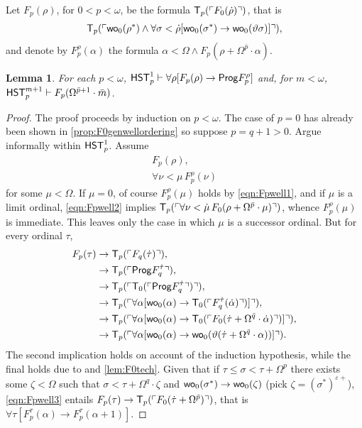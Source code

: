 \documentclass[UKenglish,cleveref,DIV=12]{scrartcl}
\newtheorem{lemma}{Lemma}[section]
\theoremstyle{definition}
\theoremstyle{definition}
\newcommand{\gelnote}[1]{\note[magenta]{#1}}
\begin{document}
Let $F_p(\rho)$, for $0<p<\omega$, be the formula $\mathsf{T}_p(\ulcorner{F_0(\dot\rho)}\urcorner)$, that is
\begin{align*}
 \mathsf{T}_{p}(\ulcorner{\mathsf{wo}_0(\rho^*)\land\forall\sigma<\dot\rho [\mathsf{wo}_0(\sigma^*)\rightarrow\mathsf{wo}_0(\vartheta\sigma)]}\urcorner),
\end{align*}
and denote by $F_p^\rho(\alpha)$ the formula $\alpha<\Omega\land F_p(\rho+\Omega^{\bar p}\cdot\alpha)$.
\begin{lemma}\label{lem:Fpwellordering1}
 For each $p<\omega$, $\mathsf{HST}_p^1\vdash \forall\rho[F_p(\rho)\rightarrow\mathsf{Prog} F_p^{\rho}]$ and, for $m<\omega$, $\mathsf{HST}_p^{m+1}\vdash F_p(\Omega^{\bar p+1}\cdot\bar m)$.
\end{lemma}
\begin{proof} The proof proceeds by induction on $p<\omega$. The case of $p=0$
has already been shown in \cref{prop:F0genwellordering} so suppose $p=q+1>0$.
Argue informally within $\mathsf{HST}_p^1$. Assume
\begin{gather}
 F_p(\rho),\label{eqn:Fpwell1}\\
 \forall\nu<\mu\,F_p^\rho(\nu)\label{eqn:Fpwell2}
\end{gather}
for some $\mu<\Omega$. If $\mu=0$, of course $F_p^\rho(\mu)$ holds by
\eqref{eqn:Fpwell1}, and if $\mu$ is a limit ordinal, \eqref{eqn:Fpwell2}
implies $\mathsf{T}_p(\ulcorner{\forall\nu<\dot\mu\,F_0(\rho+\Omega^{\bar p}\cdot\mu)}\urcorner)$,
whence $F_p^\rho(\mu)$ is immediate. This leaves only the case in which $\mu$ is a
successor ordinal. But for every ordinal $\tau$,
\begin{align}\label{eqn:Fpwell3}
\begin{split}
  F_p(\tau) &\rightarrow \mathsf{T}_p(\ulcorner{F_q(\dot\tau)}\urcorner), \\
	  &\rightarrow \mathsf{T}_p(\ulcorner{\mathsf{Prog}F_q^{\dot\tau}}\urcorner),\\
	  &\rightarrow \mathsf{T}_p(\ulcorner{\mathsf{T}_0(\ulcorner{\mathsf{Prog}F_q^{\dot\tau}}\urcorner)}\urcorner),\\
	  &\rightarrow \mathsf{T}_p(\ulcorner{\forall\alpha[\mathsf{wo}_0(\alpha)\rightarrow \mathsf{T}_0(\ulcorner{F_q^{\dot\tau}(\dot\alpha)}\urcorner)]}\urcorner),\\
	  &\rightarrow \mathsf{T}_p(\ulcorner{\forall\alpha[\mathsf{wo}_0(\alpha)\rightarrow \mathsf{T}_0(\ulcorner{F_0(\dot\tau+\Omega^{\bar q}\cdot\dot\alpha)}\urcorner)]}\urcorner),\\
	  &\rightarrow \mathsf{T}_p(\ulcorner{\forall\alpha[\mathsf{wo}_0(\alpha)\rightarrow\mathsf{wo}_0(\vartheta(\dot\tau+\Omega^{\bar q}\cdot\alpha))]}\urcorner).
	  \end{split}
\end{align}
The second implication holds on account of the induction hypothesis, while the
final holds due to  and \cref{lem:F0tech}. Given that if
$\tau\le\sigma<\tau+\Omega^{p}$ there exists
some $\zeta<\Omega$ such that $\sigma<\tau+\Omega^q\cdot\zeta$ and
$\mathsf{wo}_0(\sigma^*)\rightarrow\mathsf{wo}_0(\zeta)$ (pick
$\zeta=(\sigma^*)^{\varepsilon+}$), \eqref{eqn:Fpwell3}\gelnote{define \( \alpha^{\varepsilon+} \)}
entails $F_p(\tau)\rightarrow\mathsf{T}_p(\ulcorner{F_0(\dot\tau+\Omega^{\bar p})}\urcorner)$,
that is $\forall\tau[F_p^\tau(\alpha)\rightarrow F_p^\tau(\alpha+1)]$.


\end{proof}
\end{document}
